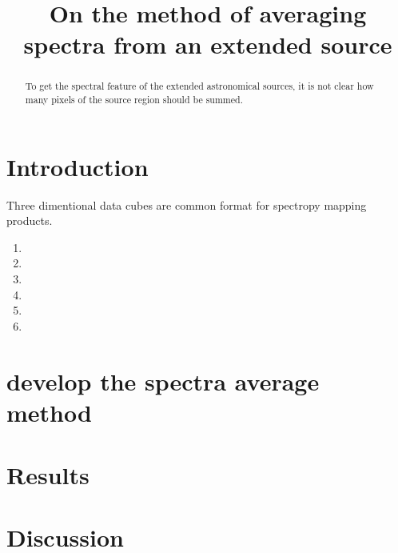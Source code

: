\documentclass[manuscript]{aastex61}
\begin{document}
\title{On the method of averaging spectra from an extended source }




\begin{abstract}
To get the spectral feature of the extended astronomical sources, it is not clear how many pixels of the source region should be summed.

\end{abstract}


\section{Introduction} \label{sec:intro}
Three dimentional data cubes are common format for spectropy mapping products.

\begin{enumerate}
\item 
\item 
\item 
\item 
\item 
\item 
\end{enumerate}

\section{develop the spectra average method} \label{sec:method}
\section{Results} \label{sec:result}
\section{Discussion} \label{sec:disc}

\acknowledgments

\appendix


\end{document}

